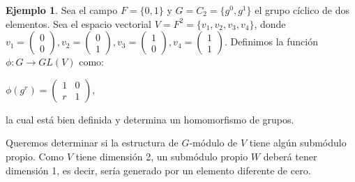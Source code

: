 \documentclass[12pt]{book}
\theoremstyle{definition}
\newtheorem{example}[theorem]{Ejemplo}
\newcounter{in}
\newcounter{ini}
\begin{document}
\begin{example}
  \label{ej-no-reducibilidad}
  Sea el campo $F=\{0,1\}$ y $G=C_{2}=\{g^{0},g^{1}\}$ el grupo
  cíclico de dos elementos. Sea el espacio vectorial
  $V=F^{2}=\{v_{1},v_{2},v_{3},v_{4}\}$, donde  
  $v_{1}=
  \begin{pmatrix}
    0\\
    0  
  \end{pmatrix},
  v_{2}=
  \begin{pmatrix}
    0\\
    1  
  \end{pmatrix},
  v_{3}=
  \begin{pmatrix}
    1\\
    0  
  \end{pmatrix},
  v_{4}=
  \begin{pmatrix}
    1\\
    1  
  \end{pmatrix}.
  $
  Definimos la función $\phi:G\rightarrow GL(V)$ como:
  \begin{center}
    $\phi(g^{r})=
    \begin{pmatrix}
      1 & 0 \\
      r & 1 
    \end{pmatrix}$,
  \end{center}
  la cual está bien definida y determina un homomorfismo de grupos.

Queremos determinar si la estructura de $G$-módulo de $V$ tiene algún submódulo propio. Como $V$
tiene dimensión 2, un submódulo propio $W$ deberá tener dimensión 1,
es decir, sería generado por un elemento diferente de cero.



\end{example}
\end{document}
